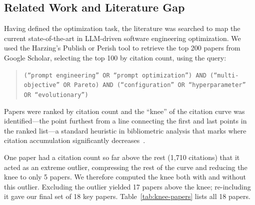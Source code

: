 \documentclass[sigconf,nonacm]{acmart}
\begin{document}
\subsection{Related Work and Literature Gap}

Having defined the optimization task, the literature was searched to map the current state-of-the-art in LLM-driven software engineering optimization. We used the Harzing's Publish or Perish tool to retrieve the top 200 papers from Google Scholar, selecting the top 100 by citation count, using the query:

\begin{quote}
\texttt{(``prompt engineering'' OR ``prompt optimization'') AND (``multi-objective'' OR Pareto) AND (``configuration'' OR ``hyperparameter'' OR ``evolutionary'')}
\end{quote}

Papers were ranked by citation count and the ``knee'' of the citation curve was identified---the point furthest from a line connecting the first and last points in the ranked list---a standard heuristic in bibliometric analysis that marks where citation accumulation significantly decreases~\cite{menzies2024moot}.

One paper had a citation count so far above the rest (1,710 citations) that it acted as an extreme outlier, compressing the rest of the curve and reducing the knee to only 5 papers. We therefore computed the knee both with and without this outlier. Excluding the outlier yielded 17 papers above the knee; re-including it gave our final set of 18 key papers. Table~\ref{tab:knee-papers} lists all 18 papers.
\end{document}
